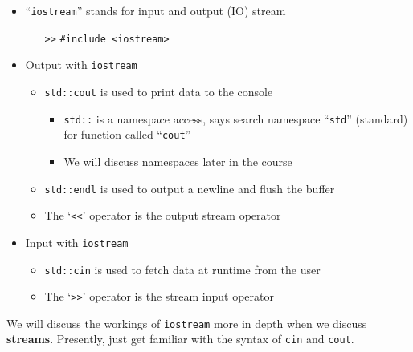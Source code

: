 \documentclass{article}
\begin{document}
\begin{itemize}
	\item ``\texttt{iostream}'' stands for input and output (IO) stream
	\begin{itemize}
		\item[\texttt{>>}] \texttt{\#include <iostream>}
	\end{itemize}
	\item Output with \texttt{iostream}
	\begin{itemize}
		\item \texttt{std::cout} is used to print data to the console
		\begin{itemize}
			\item \texttt{std::} is a namespace access, says search namespace ``\texttt{std}'' (standard) for function called ``\texttt{cout}''
			\item We will discuss namespaces later in the course
		\end{itemize}
		\item \texttt{std::endl} is used to output a newline and flush the buffer
		\item The `\texttt{<<}' operator is the output stream operator
	\end{itemize}
	\item Input with \texttt{iostream}
	\begin{itemize}
		\item \texttt{std::cin} is used to fetch data at runtime from the user
		\item The `\texttt{>>}' operator is the stream input operator
	\end{itemize}
\end{itemize}

\noindent
We will discuss the workings of \texttt{iostream} more in depth when we discuss \textbf{streams}. Presently, just get familiar with the syntax of \texttt{cin} and \texttt{cout}.

\vspace{.5em}

\end{document}
